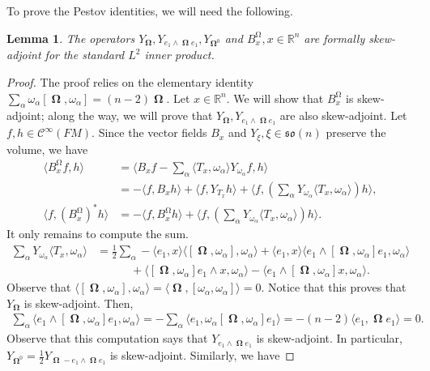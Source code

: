 \documentclass[12pt]{amsart}
\numberwithin{numbering}{section}
\theoremstyle{plain}
\newtheorem{lem}[numbering]{Lemma}
\theoremstyle{definition}
\theoremstyle{remark}
\numberwithin{equation}{section}
\DeclareMathOperator{\oo}{\mathbf{\Omega}}
\DeclareMathOperator{\mg}{\Omega}
\newcommand{\R}{\mathbb{R}}
\newcommand{\frk}[1]{\mathfrak{#1}}
\begin{document}
To prove the Pestov identities, we will need the following.
\begin{lem} \label{lem:skew_adj}
The operators $Y_{\oo}, Y_{e_1 \wedge \oo e_1}, Y_{\oo^0}$ and $B_x^{\mg}, x \in \R^n$ are formally skew-adjoint for the standard $L^2$ inner product.
\end{lem}
\begin{proof}
The proof relies on the elementary identity $\sum_{\alpha} \omega_\alpha [\oo, \omega_\alpha] = (n-2) \oo$. Let $x \in \R^n$. We will show that $B_x^{\mg}$ is skew-adjoint; along the way, we will prove that $Y_{\oo}, Y_{e_1 \wedge \oo e_1}$ are also skew-adjoint. Let $f, h \in \mathcal{C}^\infty(FM)$. Since the vector fields $B_x$ and $Y_\xi, \xi \in \frk{so}(n)$ preserve the volume, we have 
\begin{align*}
\langle B_x^{\mg} f, h \rangle 
&= \langle B_x f - \sum_\alpha \langle T_x, \omega_\alpha \rangle Y_{\omega_\alpha} f, h \rangle \\ 
&= - \langle f, B_x h \rangle + \langle f, Y_{T_x} h \rangle + \langle f, (\sum_\alpha Y_{\omega_\alpha} \langle T_x, \omega_\alpha \rangle) h \rangle, \\ 
\langle f, (B_x^{\mg})^* h \rangle 
&= - \langle f, B_x^{\mg} h \rangle + \langle f, (\sum_\alpha Y_{\omega_\alpha} \langle T_x, \omega_\alpha \rangle) h \rangle.
\end{align*}
It only remains to compute the sum.
\begin{align*}
\sum_\alpha Y_{\omega_\alpha} \langle T_x, \omega_\alpha \rangle 
&= \frac{1}{2} \sum_\alpha - \langle e_1, x \rangle \langle [\oo, \omega_\alpha], \omega_\alpha \rangle + \langle e_1, x \rangle \langle e_1 \wedge [\oo, \omega_\alpha] e_1, \omega_\alpha \rangle \\ 
&\quad \quad \quad + \langle [\oo, \omega_\alpha] e_1 \wedge x, \omega_\alpha \rangle - \langle e_1 \wedge [\oo, \omega_\alpha] x, \omega_\alpha \rangle.
\end{align*}
Observe that $\langle [\oo, \omega_\alpha], \omega_\alpha \rangle = \langle \oo, [\omega_\alpha, \omega_\alpha] \rangle = 0$. Notice that this proves that $Y_{\oo}$ is skew-adjoint. Then, 
\begin{align*}
\sum_\alpha \langle e_1 \wedge [\oo, \omega_\alpha] e_1, \omega_\alpha \rangle 
= - \sum_\alpha \langle e_1, \omega_\alpha [\oo, \omega_\alpha] e_1 \rangle = - (n-2) \langle e_1, \oo e_1 \rangle = 0.
\end{align*}
Observe that this computation says that $Y_{e_1 \wedge \oo e_1}$ is skew-adjoint. In particular, $Y_{\oo^0} = \frac{1}{2} Y_{\oo - e_1 \wedge \oo e_1}$ is skew-adjoint. Similarly, we have 

\end{proof}
\end{document}
